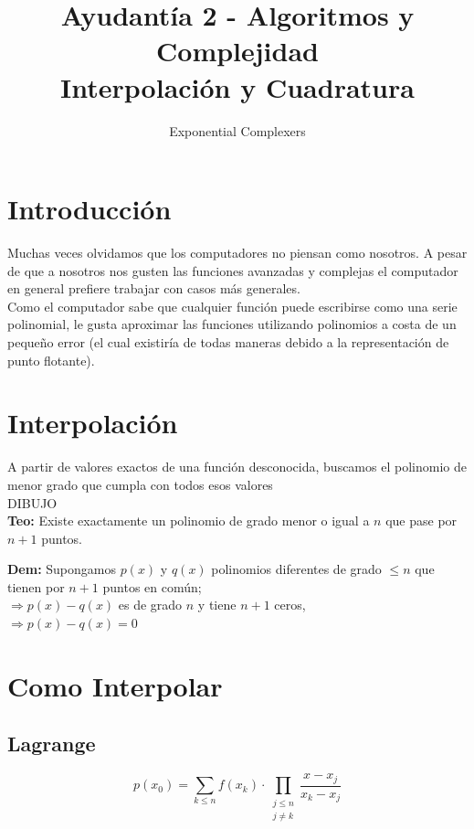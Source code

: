 \documentclass[spanish, fleqn]{article}
\title{Ayudantía 2 - Algoritmos y Complejidad\\
Interpolación y Cuadratura}
\author{Exponential Complexers}
\date{}
\begin{document}
\maketitle

\thispagestyle{empty}

\section{Introducción}

Muchas veces olvidamos que los computadores no piensan como nosotros. A pesar de que a nosotros nos gusten las funciones avanzadas y complejas el computador en general prefiere trabajar con casos más generales.\\

Como el computador sabe que cualquier función puede escribirse como una serie polinomial, le gusta aproximar las funciones utilizando polinomios a costa de un pequeño error (el cual existiría de todas maneras debido a la representación de punto flotante).

\section{Interpolación}

A partir de valores exactos de una función desconocida, buscamos el polinomio de menor grado que cumpla con todos esos valores\\

DIBUJO\\

\textbf{Teo:} Existe exactamente un polinomio de grado menor o igual a $n$ que pase por $n+1$ puntos.

\textbf{Dem:} Supongamos $p(x)$ y $q(x)$ polinomios diferentes de grado $\leq n$ que tienen por $n+1$ puntos en común;\\
$\Rightarrow p(x) - q(x)$ es de grado $n$ y tiene $n+1$ ceros,\\
$\Rightarrow p(x) - q(x) = 0$\\

\section{Como Interpolar}

\subsection{Lagrange}

\[ p(x_0) = \sum_{k \leqslant n} f(x_k) \cdot \prod_{\substack{j \leqslant n\\j \neq k}} \frac{x-x_j}{x_k-x_j} \]
\end{document}
